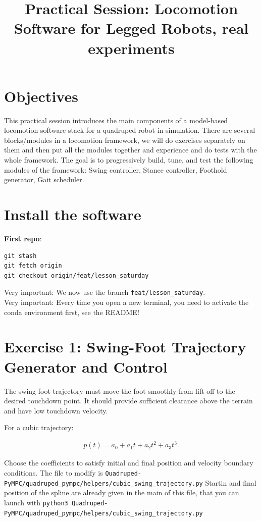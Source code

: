 \documentclass[11pt,a4paper]{article}
\title{\textbf{Practical Session: Locomotion Software for Legged Robots, real experiments}}
\author{}
\date{}
\begin{document}
\maketitle


\section*{Objectives}
This practical session introduces the main components of a model-based locomotion software stack for a quadruped robot in simulation. 
There are several blocks/modules  in a locomotion framework, we will do exercises separately on  them and then put all the modules together and experience and do tests with the whole framework.
The goal is to progressively build, tune, and test the following modules of the framework: Swing controller, Stance controller, Foothold generator, Gait scheduler. 


\section*{Install the software}
\textbf{First repo}: 

\begin{verbatim}
git stash
git fetch origin
git checkout origin/feat/lesson_saturday
\end{verbatim}

\noindent Very important: We now use the branch \texttt{feat/lesson\_saturday}.\\
Very important: Every time you open a new terminal, you need to activate the conda environment first, see the README!



\section{Exercise 1: Swing-Foot Trajectory Generator and Control}

The swing-foot trajectory must move the foot smoothly from lift-off to the desired touchdown point. It should provide sufficient clearance above the terrain and have low touchdown velocity.

For a cubic trajectory:

\begin{align*}
p(t) = a_0 + a_1t + a_2t^2 + a_3t^3.
\end{align*}

Choose the coefficients to satisfy initial and final position and velocity boundary conditions.
The file to modify is \verb|Quadruped-PyMPC/quadruped_pympc/helpers/cubic_swing_trajectory.py| 
Startin and final position of the spline are already given in the main of this file, that you can launch with
 \verb|python3 Quadruped-PyMPC/quadruped_pympc/helpers/cubic_swing_trajectory.py| 
\end{document}
